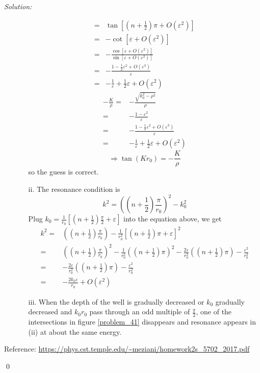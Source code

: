 \documentclass[10pt,a4paper]{article}
\newenvironment{sol}
    {\emph{Solution:}
    }
    {
    \qed
    }
\begin{document}
\begin{sol}
\begin{itemize}
\begin{itemize}
\begin{align}
\nonumber=&\tan\left[(n+\frac{1}{2})\pi+O(\varepsilon^2)\right]\\
\nonumber=&-\cot\left[\varepsilon+O(\varepsilon^2)\right]\\
\nonumber=&-\frac{\cos\left[\varepsilon+O(\varepsilon^2)\right]}{\sin\left[\varepsilon+O(\varepsilon^2)\right]}\\
\nonumber=&-\frac{1-\frac{1}{2}\varepsilon^2+O(\varepsilon^3)}{\varepsilon}\\
=&-\frac{1}{\varepsilon}+\frac{1}{2}\varepsilon+O(\varepsilon^2)
\end{align}
\begin{align}
\nonumber-\frac{K}{\rho}=&-\frac{\sqrt{k_0^2-\rho^2}}{\rho}\\
\nonumber=&-\frac{1-\varepsilon^2}{\varepsilon}\\
\nonumber=&-\frac{1-\frac{1}{2}\varepsilon^2+O(\varepsilon^3)}{\varepsilon}\\
=&-\frac{1}{\varepsilon}+\frac{1}{2}\varepsilon+O(\varepsilon^2)
\end{align}
\begin{equation}
\Longrightarrow\tan(Kr_0)=-\frac{K}{\rho}
\end{equation}
so the guess is correct.
\item[ii.] The resonance condition is
\begin{equation}
k^2=\left((n+\frac{1}{2})\frac{\pi}{r_0}\right)^2-k_0^2
\end{equation}
Plug $k_0=\frac{1}{r_0}[(n+\frac{1}{2})\frac{\pi}{2}+\varepsilon]$ into the equation above, we get
\begin{align}
\nonumber k^2=&\left((n+\frac{1}{2})\frac{\pi}{r_0}\right)-\frac{1}{r_0^2}\left[(n+\frac{1}{2})\pi+\varepsilon\right]^2\\
\nonumber=&\left((n+\frac{1}{2})\frac{\pi}{r_0}\right)^2-\frac{1}{r_0^2}\left((n+\frac{1}{2})\pi\right)^2-\frac{2\varepsilon}{r_0^2}\left((n+\frac{1}{2})\pi\right)-\frac{\varepsilon^2}{r_0^2}\\
\nonumber=&-\frac{2\varepsilon}{r_0^2}\left((n+\frac{1}{2})\pi\right)-\frac{\varepsilon^2}{r_0^2}\\
\nonumber=&-\frac{2k_0\varepsilon}{r_0}+O(\varepsilon^2)
\end{align}
\item[iii.] When the depth of the well is gradually decreased or $k_0$ gradually decreased and $k_0r_0$ pass through an odd multiple of $\frac{\pi}{2}$, one of the intersections in figure \ref{problem_41} disappears and resonance appears in (ii) at about the same energy.
\end{itemize}
\end{itemize}
\small{Reference: \url{https://phys.cst.temple.edu/~meziani/homework2s_5702_2017.pdf}}
\end{sol}
\end{document}
